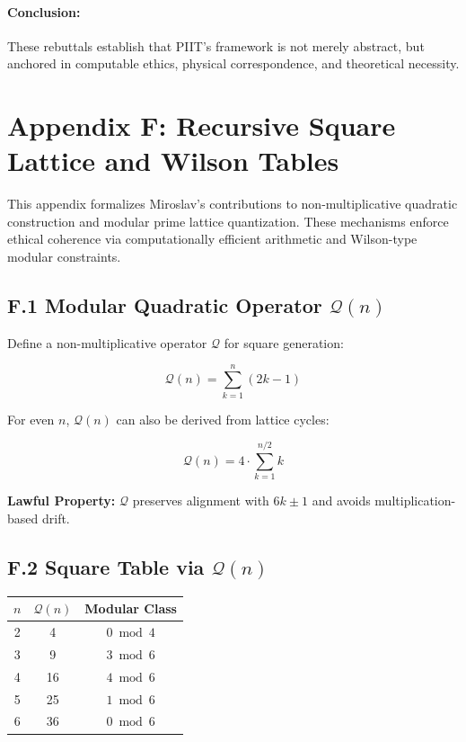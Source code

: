 \documentclass[12pt]{article}
\begin{document}
\paragraph{Conclusion:} These rebuttals establish that PIIT's framework is not merely abstract, but anchored in computable ethics, physical correspondence, and theoretical necessity.

\clearpage

\section*{Appendix F: Recursive Square Lattice and Wilson Tables}

This appendix formalizes Miroslav's contributions to non-multiplicative quadratic construction and modular prime lattice quantization. These mechanisms enforce ethical coherence via computationally efficient arithmetic and Wilson-type modular constraints.

\subsection*{F.1 Modular Quadratic Operator $\mathcal{Q}(n)$}

Define a non-multiplicative operator $\mathcal{Q}$ for square generation:

\begin{equation}
\mathcal{Q}(n) = \sum_{k=1}^{n} (2k - 1)
\end{equation}

\noindent
For even $n$, $\mathcal{Q}(n)$ can also be derived from lattice cycles:

\begin{equation}
\mathcal{Q}(n) = 4 \cdot \sum_{k=1}^{n/2} k
\end{equation}

\noindent
\textbf{Lawful Property:} $\mathcal{Q}$ preserves alignment with $6k \pm 1$ and avoids multiplication-based drift.

\subsection*{F.2 Square Table via $\mathcal{Q}(n)$}

\begin{center}
\begin{tabular}{c|c|c}
$n$ & $\mathcal{Q}(n)$ & Modular Class \\
\hline
2 & 4 & $0 \bmod 4$ \\
3 & 9 & $3 \bmod 6$ \\
4 & 16 & $4 \bmod 6$ \\
5 & 25 & $1 \bmod 6$ \\
6 & 36 & $0 \bmod 6$ \\
\end{tabular}
\end{center}
\end{document}
